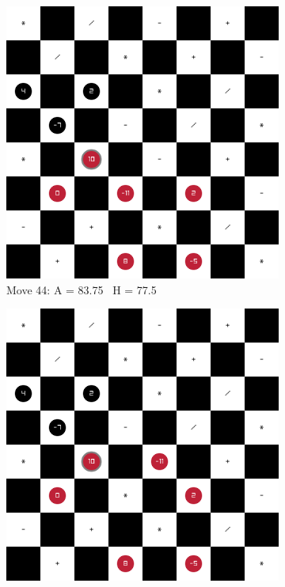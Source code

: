 \begin{figure}[H]
    \centering
    \begin{subfigure}{0.3\textwidth}
        \centering
        \includegraphics[width=\textwidth]{images/games/game1/move_45.png}
        \caption*{Move 44:  A = 83.75 \textbar\ H = 77.5}
    \end{subfigure}
    \quad
    \begin{subfigure}{0.3\textwidth}
        \centering
        \includegraphics[width=\textwidth]{images/games/game1/move_46.png}

\end{subfigure}
\end{figure}

